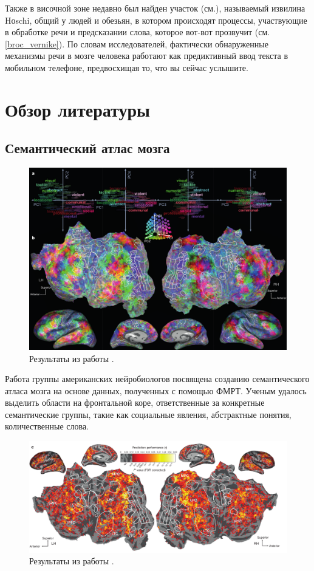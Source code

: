 \documentclass[pdftex,ptm,12pt,a4paper]{report}
\theoremstyle{definition}
\begin{document}
Также в височной зоне недавно был найден участок (см.\cite{kikuchi2017sequence}), называемый извилина Hоschi, общий у людей и обезьян, в котором происходят процессы, участвующие в обработке речи и предсказании слова, которое вот-вот прозвучит (см. \ref{broc_vernike}). По словам исследователей, фактически обнаруженные механизмы речи в мозге человека работают как предиктивный ввод текста в мобильном телефоне, предвосхищая то, что вы сейчас услышите.

\chapter{Обзор литературы}
\section{Семантический атлас мозга}\label{complex}

\begin{figure}[h]
\includegraphics[scale=0.4]{images/galant_results.png}
\centering
\caption{Результаты из работы \cite{huth2016natural}.}
\label{huth_result}
\end{figure}

Работа \cite{huth2016natural} группы американских нейробиологов посвящена созданию семантического атласа мозга на основе данных, полученных с помощью ФМРТ. Ученым удалось выделить области на фронтальной коре, ответственные за конкретные семантические группы, такие как социальные явления, абстрактные понятия, количественные слова. 

\begin{figure}[h]
\includegraphics[scale=0.37]{images/map_result_huth.png}
\centering
\caption{Результаты из работы \cite{huth2016natural}.}
\label{map_huth_result}
\end{figure}
\end{document}
